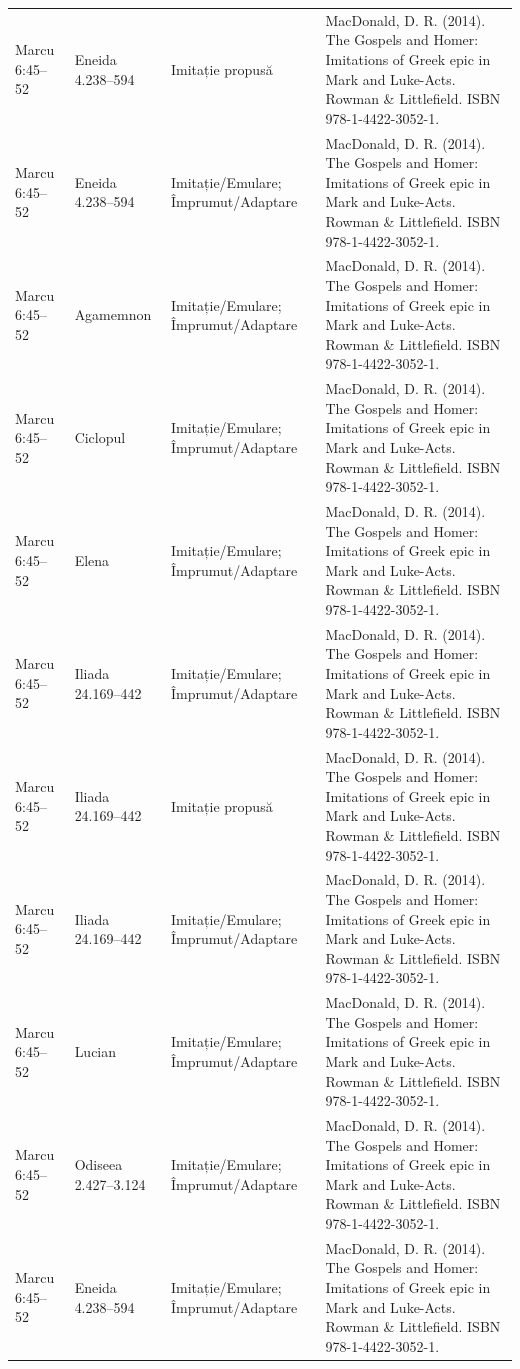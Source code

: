 \documentclass[12pt,a4paper,twoside,openany]{book}
\begin{document}
\begin{longtable}{L{1.4cm}L{1.7cm}L{3.1cm}L{8.4cm}}
Marcu 6:45–52 & Eneida 4.238–594 & Imitație propusă & MacDonald, D. R. (2014). The Gospels and Homer: Imitations of Greek epic in Mark and Luke-Acts. Rowman \& Littlefield. ISBN 978-1-4422-3052-1. \\
Marcu 6:45–52 & Eneida 4.238–594 & Imitație/Emulare; Împrumut/Adaptare & MacDonald, D. R. (2014). The Gospels and Homer: Imitations of Greek epic in Mark and Luke-Acts. Rowman \& Littlefield. ISBN 978-1-4422-3052-1. \\
Marcu 6:45–52 & Agamemnon & Imitație/Emulare; Împrumut/Adaptare & MacDonald, D. R. (2014). The Gospels and Homer: Imitations of Greek epic in Mark and Luke-Acts. Rowman \& Littlefield. ISBN 978-1-4422-3052-1. \\
Marcu 6:45–52 & Ciclopul & Imitație/Emulare; Împrumut/Adaptare & MacDonald, D. R. (2014). The Gospels and Homer: Imitations of Greek epic in Mark and Luke-Acts. Rowman \& Littlefield. ISBN 978-1-4422-3052-1. \\
Marcu 6:45–52 & Elena & Imitație/Emulare; Împrumut/Adaptare & MacDonald, D. R. (2014). The Gospels and Homer: Imitations of Greek epic in Mark and Luke-Acts. Rowman \& Littlefield. ISBN 978-1-4422-3052-1. \\
Marcu 6:45–52 & Iliada 24.169–442 & Imitație/Emulare; Împrumut/Adaptare & MacDonald, D. R. (2014). The Gospels and Homer: Imitations of Greek epic in Mark and Luke-Acts. Rowman \& Littlefield. ISBN 978-1-4422-3052-1. \\
Marcu 6:45–52 & Iliada 24.169–442 & Imitație propusă & MacDonald, D. R. (2014). The Gospels and Homer: Imitations of Greek epic in Mark and Luke-Acts. Rowman \& Littlefield. ISBN 978-1-4422-3052-1. \\
Marcu 6:45–52 & Iliada 24.169–442 & Imitație/Emulare; Împrumut/Adaptare & MacDonald, D. R. (2014). The Gospels and Homer: Imitations of Greek epic in Mark and Luke-Acts. Rowman \& Littlefield. ISBN 978-1-4422-3052-1. \\
Marcu 6:45–52 & Lucian & Imitație/Emulare; Împrumut/Adaptare & MacDonald, D. R. (2014). The Gospels and Homer: Imitations of Greek epic in Mark and Luke-Acts. Rowman \& Littlefield. ISBN 978-1-4422-3052-1. \\
Marcu 6:45–52 & Odiseea 2.427–3.124 & Imitație/Emulare; Împrumut/Adaptare & MacDonald, D. R. (2014). The Gospels and Homer: Imitations of Greek epic in Mark and Luke-Acts. Rowman \& Littlefield. ISBN 978-1-4422-3052-1. \\
Marcu 6:45–52 & Eneida 4.238–594 & Imitație/Emulare; Împrumut/Adaptare & MacDonald, D. R. (2014). The Gospels and Homer: Imitations of Greek epic in Mark and Luke-Acts. Rowman \& Littlefield. ISBN 978-1-4422-3052-1. \\

\end{longtable}
\end{document}
